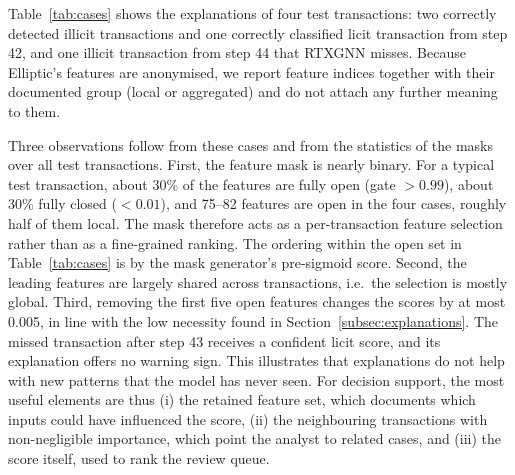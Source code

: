 Table~\ref{tab:cases} shows the explanations of four test transactions: two correctly detected illicit transactions and one correctly classified licit transaction from step 42, and one illicit transaction from step 44 that RTXGNN misses. Because Elliptic's features are anonymised, we report feature indices together with their documented group (local or aggregated) and do not attach any further meaning to them.

Three observations follow from these cases and from the statistics of the masks over all test transactions. First, the feature mask is nearly binary. For a typical test transaction, about 30\% of the features are fully open (gate $>0.99$), about 30\% fully closed ($<0.01$), and 75--82 features are open in the four cases, roughly half of them local. The mask therefore acts as a per-transaction feature selection rather than as a fine-grained ranking. The ordering within the open set in Table~\ref{tab:cases} is by the mask generator's pre-sigmoid score. Second, the leading features are largely shared across transactions, i.e.\ the selection is mostly global. Third, removing the first five open features changes the scores by at most 0.005, in line with the low necessity found in Section~\ref{subsec:explanations}. The missed transaction after step 43 receives a confident licit score, and its explanation offers no warning sign. This illustrates that explanations do not help with new patterns that the model has never seen. For decision support, the most useful elements are thus (i) the retained feature set, which documents which inputs could have influenced the score, (ii) the neighbouring transactions with non-negligible importance, which point the analyst to related cases, and (iii) the score itself, used to rank the review queue.
